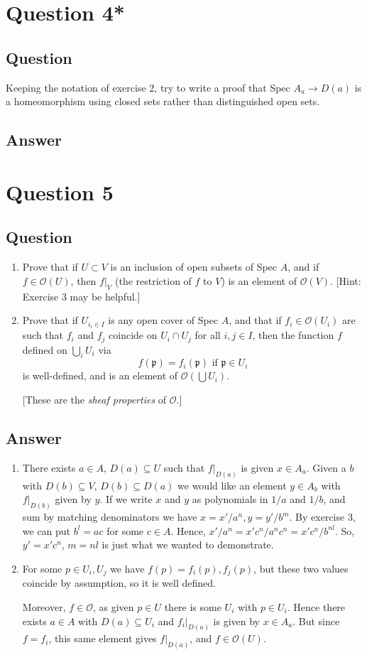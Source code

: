 \documentclass[11pt]{article}
\begin{document}
\section*{Question 4*}
\subsection*{Question}
Keeping the notation of exercise 2, try to write a proof that Spec $A_a \to D(a)$ is a homeomorphism using closed sets rather than distinguished open sets.
\subsection*{Answer}

\section{Question 5}
\subsection{Question}
\begin{enumerate}
\item Prove that if $U \subset V$ is an inclusion of open subsets of Spec $A$, and  if $f \in \mathcal{O}(U)$, then $f|_V$ (the restriction of $f$ to $V$) is an element of $\mathcal{O}(V)$. [Hint: Exercise 3 may be helpful.]
\item Prove that if $U_{i_i \in I}$ is any open cover of Spec $A$, and that if $f_i \in \mathcal{O}(U_i)$ are such that $f_i$ and $f_j$ coincide on $U_i \cap U_j$ for all $i,j \in I$, then the function $f$ defined on $\bigcup_i U_i$ via
\[f(\mathfrak{p} ) = f_i(\mathfrak{p}) \mbox{ if } \mathfrak{p}  \in U_i\]
is well-defined, and is an element of $\mathcal{O}(\bigcup{U_i})$.

[These are the \emph{sheaf properties} of $\mathcal{O}$.]
\end{enumerate}
\subsection{Answer}
\begin{enumerate}
\item There exists $a \in A$, $D(a) \subseteq U$ such that $f|_{D(a)}$ is given $x \in A_a$. Given a $b$ with $D(b) \subseteq V$, $D(b) \subseteq D(a)$ we would like an element  $ y \in A_b$ with $f|_{D(b)} $ given by $y$. If we write $x$ and $y$ as polynomials in $1/a$ and $1/b$, and sum by matching denominators we have $x = x' / a^n, y = y' / b^m$. By exercise 3, we can put $b^l = a c $ for some $c \in A$. Hence, $x'/ a^n = x' c^n / a^n c^n = x' c^n / b^{n l}$. So, $y' =  x' c^n$, $m = nl$ is just what we wanted to demonstrate.
\item For some $p \in U_i, U_j$ we have $f(p) = f_i(p) , f_j(p)$, but these two values coincide by assumption, so it is well defined.

Moreover, $f \in \mathcal{O}$, as given $p \in U$ there is some $U_i$ with $p \in U_i$. Hence there exists $a \in A$ with $D(a) \subseteq U_i$ and $f_i|_{D(a)}$ is given by $x \in A_a$. But since $f = f_i$, this same element gives $f|_{D(a)}$, and $f \in \mathcal{O}(U)$. 
\end{enumerate}
\end{document}
